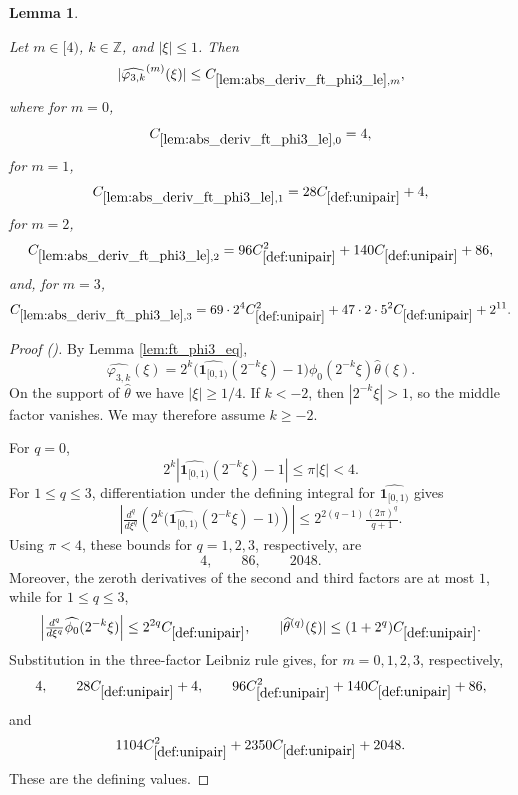\documentclass[12pt,reqno]{amsart}
\newcommand{\auto}{{({\tiny\faCar})}}
\theoremstyle{plain}
\newtheorem{lemma}[theorem]{Lemma}
\numberwithin{equation}{section}
\theoremstyle{remark}
\newcommand{\uses}[1]{}
\newcommand{\usesdefs}[1]{}
\newcommand{\leanok}{}
\newcommand{\lean}[1]{}
\newcommand{\Z}{{\mathbb Z}}
\begin{document}
\begin{lemma}\label{lem:abs_deriv_ft_phi3_le}\uses{lem:ft_phi3_eq}\usesdefs{def:cn-window,def:unipair,defn:window based bump functions}
\lean{Auto.absDerivFourierPhiThreeLe}
\leanok
Let $m\in[4)$, $k\in\Z$, and $|\xi|\le1$. Then
\begin{equation}\label{auto:varphi-three-Fourier-derivative-bound}
|\widehat{\varphi_{3,k}}^{(m)}(\xi)|
\le C_{\ref{lem:abs_deriv_ft_phi3_le},m},
\end{equation}
where for $m=0$,
\begin{equation}\label{auto:varphi-three-Fourier-derivative-constant}
C_{\ref{lem:abs_deriv_ft_phi3_le},0}=4,
\end{equation}
for $m=1$,
\begin{equation}\label{auto:varphi-three-Fourier-derivative-constant-one}
C_{\ref{lem:abs_deriv_ft_phi3_le},1}=28C_{\ref{def:unipair}}+4,
\end{equation}
for $m=2$,
\begin{equation}\label{auto:varphi-three-Fourier-derivative-constant-two}
C_{\ref{lem:abs_deriv_ft_phi3_le},2}=96C_{\ref{def:unipair}}^2+140C_{\ref{def:unipair}}+86,
\end{equation}
and, for $m=3$,
\begin{equation}\label{auto:varphi-three-Fourier-derivative-constant-three}
C_{\ref{lem:abs_deriv_ft_phi3_le},3}=69\cdot2^4C_{\ref{def:unipair}}^2+47\cdot2\cdot5^2C_{\ref{def:unipair}}+2^{11}.
\end{equation}
\end{lemma}
\begin{proof}[Proof \auto]
By Lemma \ref{lem:ft_phi3_eq},
\[
\widehat{\varphi_{3,k}}(\xi)
=
2^k\bigl(\widehat{\mathbf1_{[0,1)}}(2^{-k}\xi)-1\bigr)
\widehat{\phi_0}(2^{-k}\xi)\widehat\theta(\xi).
\]
On the support of $\widehat\theta$ we have $|\xi|\ge1/4$. If $k<-2$, then $|2^{-k}\xi|>1$, so the middle factor vanishes. We may therefore assume $k\ge-2$.

For $q=0$,
\[
2^k|\widehat{\mathbf1_{[0,1)}}(2^{-k}\xi)-1|
\le\pi|\xi|<4.
\]
For $1\le q\le3$, differentiation under the defining integral for $\widehat{\mathbf1_{[0,1)}}$ gives
\[
\left|\tfrac{d^q}{d\xi^q}
\left(2^k\bigl(\widehat{\mathbf1_{[0,1)}}(2^{-k}\xi)-1\bigr)\right)\right|
\le2^{2(q-1)}\tfrac{(2\pi)^q}{q+1}.
\]
Using $\pi<4$, these bounds for $q=1,2,3$, respectively, are
\[
4,
\qquad
86,
\qquad
2048.
\]
Moreover, the zeroth derivatives of the second and third factors are at most $1$, while for $1\le q\le3$,
\[
\left|\tfrac{d^q}{d\xi^q}\widehat{\phi_0}(2^{-k}\xi)\right|
\le2^{2q}C_{\ref{def:unipair}},
\qquad
|\widehat\theta^{(q)}(\xi)|\le(1+2^q)C_{\ref{def:unipair}}.
\]
Substitution in the three-factor Leibniz rule gives, for $m=0,1,2,3$, respectively,
\[
4,
\qquad
28C_{\ref{def:unipair}}+4,
\qquad
96C_{\ref{def:unipair}}^2+140C_{\ref{def:unipair}}+86,
\]
and
\[
1104C_{\ref{def:unipair}}^2+2350C_{\ref{def:unipair}}+2048.
\]
These are the defining values.
\end{proof}
\end{document}

